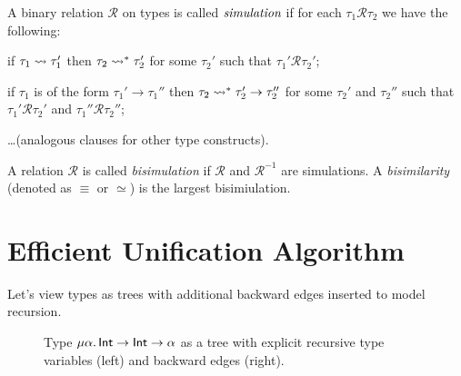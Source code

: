 \begin{defin}
  A binary relation $\mathcal{R}$ on types is called $\emph{simulation}$
  if for each $\tau_1\mathrel{\mathcal{R}} \tau_2$ we have the following:
  \begin{thmenumerate}
  \item if $\tau_1 \leadsto \tau_1'$ then
    $\tau_2 \leadsto^* \tau_2'$
    for some $\tau_2'$
    such that $\tau_1' \mathrel{\mathcal{R}} \tau_2'$;
  \item if $\tau_1$ is of the form $\tau_1' \to \tau_1''$
    then $\tau_2 \leadsto^* \tau_2' \to \tau_2''$
    for some $\tau_2'$ and $\tau_2''$
    such that $\tau_1' \mathrel{\mathcal{R}} \tau_2'$
    and $\tau_1'' \mathrel{\mathcal{R}} \tau_2''$;
  \item \ldots (analogous clauses for other type constructs).
  \end{thmenumerate}
  A relation $\mathcal{R}$ is called \emph{bisimulation}
  if $\mathcal{R}$ and $\mathcal{R}^{-1}$ are simulations.
  A \emph{bisimilarity} (denoted as $\equiv$ or $\simeq$)
  is the largest bisimiulation.
\end{defin}

\section{Efficient Unification Algorithm}

Let's view types as trees with additional backward edges
inserted to model recursion.

\begin{figure}[H]
    \centering
    \caption{Type $\mu\alpha\ldotp \textsf{Int}\to\textsf{Int}\to\alpha$ as a tree
    with explicit recursive type variables (left) and backward edges (right).}
\end{figure}


